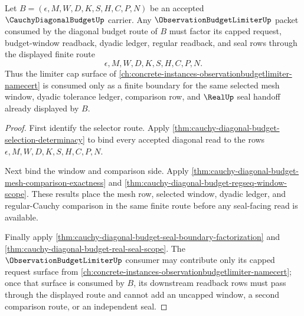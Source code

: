 \begin{theorem}
\label{thm:cauchy-diagonal-budget-observation-limiter-consumer-boundary}
Let $B=(\epsilon,M,W,D,K,S,H,C,P,N)$ be an accepted $\CauchyDiagonalBudgetUp$ carrier. Any $\ObservationBudgetLimiterUp$ packet consumed by the diagonal budget route of $B$ must factor its capped request, budget-window readback, dyadic ledger, regular readback, and seal rows through the displayed finite route
$$
\epsilon,M,W,D,K,S,H,C,P,N.
$$
Thus the limiter cap surface of \autoref{ch:concrete-instances-observationbudgetlimiter-namecert} is consumed only as a finite boundary for the same selected mesh window, dyadic tolerance ledger, comparison row, and $\RealUp$ seal handoff already displayed by $B$.
\end{theorem}
\begin{proof}
First identify the selector route. Apply \autoref{thm:cauchy-diagonal-budget-selection-determinacy} to bind every accepted diagonal read to the rows $\epsilon,M,W,D,K,S,H,C,P,N$.

Next bind the window and comparison side. Apply \autoref{thm:cauchy-diagonal-budget-mesh-comparison-exactness} and \autoref{thm:cauchy-diagonal-budget-regseq-window-scope}. These results place the mesh row, selected window, dyadic ledger, and regular-Cauchy comparison in the same finite route before any seal-facing read is available.

Finally apply \autoref{thm:cauchy-diagonal-budget-seal-boundary-factorization} and \autoref{thm:cauchy-diagonal-budget-real-seal-scope}. The $\ObservationBudgetLimiterUp$ consumer may contribute only its capped request surface from \autoref{ch:concrete-instances-observationbudgetlimiter-namecert}; once that surface is consumed by $B$, its downstream readback rows must pass through the displayed route and cannot add an uncapped window, a second comparison route, or an independent seal.
\end{proof}

